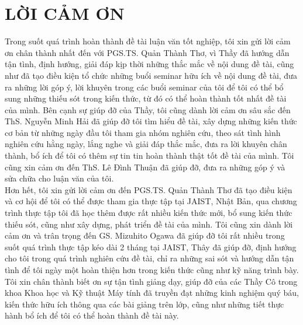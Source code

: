 
\newpage
\chapter{LỜI CẢM ƠN}

\setlength\parindent{0pt}
\hspace{0.5cm}Trong suốt quá trình hoàn thành đề tài luận văn tốt nghiệp, tôi xin gửi lời cảm ơn chân thành nhất đến với PGS.TS. Quản Thành Thơ, vì Thầy đã hướng dẫn tận tình, định hướng, giải đáp kịp thời những thắc mắc về nội dung đề tài, cũng như đã tạo điều kiện tổ chức những buổi seminar hữu ích về nội dung đề tài, đưa ra những lời góp ý, lời khuyên trong các buổi seminar của tôi để tôi có thể bổ sung những thiếu sót trong kiến thức, từ đó có thể hoàn thành tốt nhất đề tài của mình. Bên cạnh sự giúp đỡ của Thầy, tôi cũng dành lời cảm ơn sâu sắc đến ThS. Nguyễn Minh Hải đã giúp đỡ tôi tìm hiểu đề tài, xây dựng những kiến thức cơ bản từ những ngày đầu tôi tham gia nhóm nghiên cứu, theo sát tình hình nghiên cứu hằng ngày, lắng nghe và giải đáp thắc mắc, đưa ra lời khuyên chân thành, bổ ích để tôi có thêm sự tin tin hoàn thành thật tốt đề tài của mình. Tôi cũng xin cảm ơn đến ThS. Lê Đình Thuận đã giúp đỡ, đưa ra những góp ý và sửa chữa cho luận văn của tôi.\\

\hspace{0.5cm}Hơn hết, tôi xin gửi lời cảm ơn đến PGS.TS. Quản Thành Thơ đã tạo điều kiện và cơ hội để tôi có thể được tham gia thực tập tại JAIST, Nhật Bản, qua chương trình thực tập tôi đã học thêm được rất nhiều kiến thức mới, bổ sung kiến thức thiếu sót, cũng như xây dựng, phát triển đề tài của mình. Tôi cũng xin dành lời cảm ơn và trân trọng đến GS. Mizuhito Ogawa đã giúp đỡ tôi rất nhiều trong suốt quá trình thực tập kéo dài 2 tháng tại JAIST, Thây đã giúp đỡ, định hướng cho tôi trong quá trình nghiên cứu đề tài, chỉ ra những sai sót và hướng dẫn tận tình để tôi ngày một hoàn thiện hơn trong kiến thức cũng như kỹ năng trình bày.\\

\hspace{0.5cm}Tôi xin chân thành biết ơn sự tận tình giảng dạy, giúp đỡ của các Thầy Cô trong khoa Khoa học và Kỹ thuật Máy tính đã truyền đạt những kinh nghiệm quý báu, kiến thức hữu ích thông qua các bài giảng trên lớp, cũng như những tiết thực hành bổ ích để tôi có thể hoàn thành đề tài này.\\

